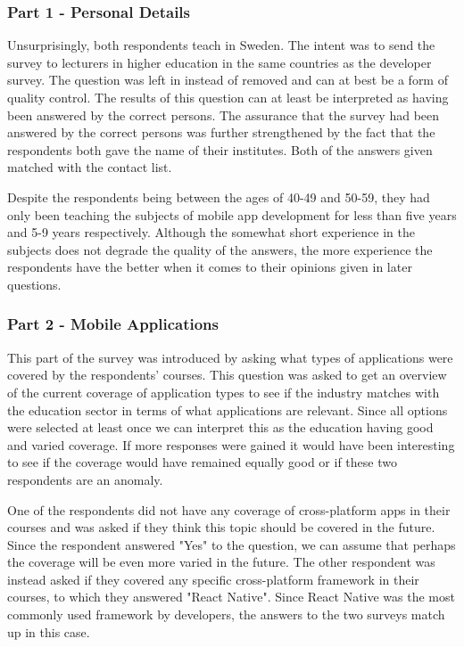 \documentclass[a4paper,12pt]{article}
\begin{document}
\subsubsection{Part 1 - Personal Details}
\label{Analysis_eduSurvey_part1}
Unsurprisingly, both respondents teach in Sweden. The intent was to send the survey to lecturers in higher education in the same countries as the developer survey. The question was left in instead of removed and can at best be a form of quality control. The results of this question can at least be interpreted as having been answered by the correct persons. The assurance that the survey had been answered by the correct persons was further strengthened by the fact that the respondents both gave the name of their institutes. Both of the answers given matched with the contact list.

Despite the respondents being between the ages of 40-49 and 50-59, they had only been teaching the subjects of mobile app development for less than five years and 5-9 years respectively. Although the somewhat short experience in the subjects does not degrade the quality of the answers, the more experience the respondents have the better when it comes to their opinions given in later questions.

\subsubsection{Part 2 - Mobile Applications}
\label{Analysis_eduSurvey_part2}
This part of the survey was introduced by asking what types of applications were covered by the respondents' courses. This question was asked to get an overview of the current coverage of application types to see if the industry matches with the education sector in terms of what applications are relevant. Since all options were selected at least once we can interpret this as the education having good and varied coverage. If more responses were gained it would have been interesting to see if the coverage would have remained equally good or if these two respondents are an anomaly.

One of the respondents did not have any coverage of cross-platform apps in their courses and was asked if they think this topic should be covered in the future. Since the respondent answered "Yes" to the question, we can assume that perhaps the coverage will be even more varied in the future. The other respondent was instead asked if they covered any specific cross-platform framework in their courses, to which they answered "React Native". Since React Native was the most commonly used framework by developers, the answers to the two surveys match up in this case.
\end{document}
